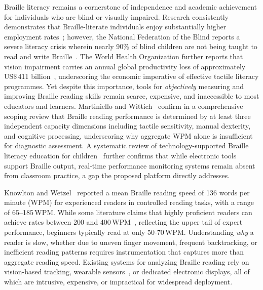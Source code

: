 \documentclass[conference]{IEEEtran}
\begin{document}
    Braille literacy remains a cornerstone of independence and academic
    achievement for individuals who are blind or visually impaired.
    Research consistently demonstrates that Braille-literate individuals
    enjoy substantially higher employment rates~\cite{b10}; however, the National Federation of the Blind reports a severe literacy crisis wherein nearly 90\% of blind children are not being taught to read and write Braille~\cite{nfb2009}. The World Health
    Organization further reports that vision impairment carries an annual
    global productivity loss of approximately
    US\$\,411 billion~\cite{b11}, underscoring the economic imperative of
    effective tactile literacy programmes. Yet despite this importance,
    tools for \emph{objectively} measuring and improving Braille reading
    skills remain scarce, expensive, and inaccessible to most educators
    and learners. Martiniello and Wittich~\cite{martiniello2022} confirm in a
    comprehensive scoping review that Braille reading performance is determined
    by at least three independent capacity dimensions including tactile sensitivity,
    manual dexterity, and cognitive processing, underscoring why aggregate WPM
    alone is insufficient for diagnostic assessment. A systematic review of
    technology-supported Braille literacy education for
    children~\cite{techbraillesysrev2022} further confirms that while electronic
    tools support Braille output, real-time performance monitoring systems remain
    absent from classroom practice, a gap the proposed platform directly
    addresses.

    Knowlton and Wetzel~\cite{b12} reported a mean Braille reading speed
    of 136 words per minute (WPM) for experienced readers in controlled
    reading tasks, with a range of 65--185\,WPM. While some literature claims that highly proficient readers can achieve rates between 200 and 400\,WPM~\cite{legge1999}, reflecting the upper tail of expert performance, beginners typically read at only 50-70\,WPM. Understanding \emph{why} a reader is slow, whether due
    to uneven finger movement, frequent backtracking, or inefficient
    reading patterns requires instrumentation that captures more than
    aggregate reading speed. Existing systems for analyzing Braille
    reading  rely on vision-based tracking, wearable sensors~\cite{divyansh-vlsid, divyansh-iccae, chinmay-sensors}, or
    dedicated electronic displays, all of which are intrusive, expensive,
    or impractical for widespread deployment.
\end{document}
